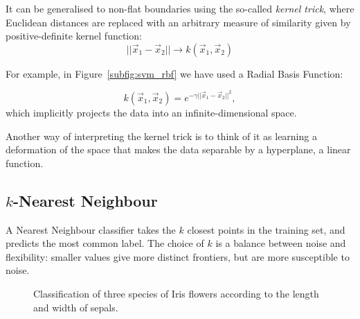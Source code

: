 It can be generalised  to non-flat boundaries using the so-called \emph{kernel trick}, where Euclidean distances are replaced with an arbitrary measure of similarity given by positive-definite kernel function:
\[||\vec{x}_1 - \vec{x}_2|| \rightarrow k(\vec{x}_1, \vec{x}_2)\]

For example, in Figure~\ref{subfig:svm_rbf} we have used a Radial Basis Function:

\[k(\vec{x}_1, \vec{x}_2) = e^{-\gamma ||\vec{x}_1 - \vec{x}_2||^2 },\]
which implicitly projects the data into an infinite-dimensional space.

Another way of interpreting the kernel trick is to think of it as learning a deformation of the space that makes the data separable by a hyperplane, a linear function.

\subsection{$k$-Nearest Neighbour}
A Nearest Neighbour classifier takes the $k$ closest points in the training set, and predicts the most common label.
The choice of $k$ is a balance between noise and flexibility: smaller values give more distinct frontiers, but are more susceptible to noise.

\begin{figure}[htb]
	\centering
	\hfill
	\caption{Classification of three species of Iris flowers according to the length and width of sepals.}\label{fig:knn}
\end{figure}

